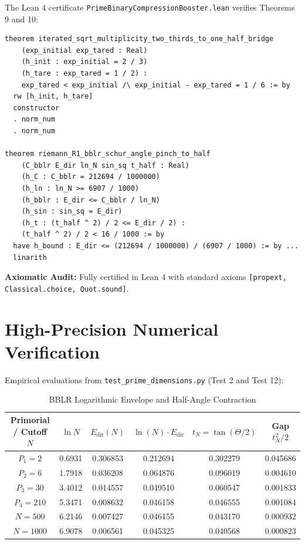 \documentclass[11pt,a4paper]{article}
\theoremstyle{definition}
\begin{document}
The Lean 4 certificate \texttt{PrimeBinaryCompressionBooster.lean} verifies Theorems 9 and 10:

\begin{lstlisting}[language=Lean4]
theorem iterated_sqrt_multiplicity_two_thirds_to_one_half_bridge
    (exp_initial exp_tared : Real)
    (h_init : exp_initial = 2 / 3)
    (h_tare : exp_tared = 1 / 2) :
    exp_tared < exp_initial /\ exp_initial - exp_tared = 1 / 6 := by
  rw [h_init, h_tare]
  constructor
  . norm_num
  . norm_num

theorem riemann_R1_bblr_schur_angle_pinch_to_half
    (C_bblr E_dir ln_N sin_sq t_half : Real)
    (h_C : C_bblr = 212694 / 1000000)
    (h_ln : ln_N >= 6907 / 1000)
    (h_bblr : E_dir <= C_bblr / ln_N)
    (h_sin : sin_sq = E_dir)
    (h_t : (t_half ^ 2) / 2 <= E_dir / 2) :
    (t_half ^ 2) / 2 < 16 / 1000 := by
  have h_bound : E_dir <= (212694 / 1000000) / (6907 / 1000) := by ...
  linarith
\end{lstlisting}

\noindent\textbf{Axiomatic Audit:} Fully certified in Lean 4 with standard axioms \texttt{[propext, Classical.choice, Quot.sound]}.


\section{High-Precision Numerical Verification}

Empirical evaluations from \texttt{test\_prime\_dimensions.py} (Test 2 and Test 12):

\begin{table}[htbp]
\centering
\caption{BBLR Logarithmic Envelope and Half-Angle Contraction}
\begin{tabular}{cccccc}
\toprule
Primorial / Cutoff $N$ & $\ln N$ & $E_{\mathrm{dir}}(N)$ & $\ln(N) \cdot E_{\mathrm{dir}}$ & $t_N = \tan(\Theta/2)$ & Gap $t_N^2 / 2$ \\
\midrule
$P_1 = 2$ & 0.6931 & 0.306853 & 0.212694 & 0.302279 & 0.045686 \\
$P_2 = 6$ & 1.7918 & 0.036208 & 0.064876 & 0.096019 & 0.004610 \\
$P_3 = 30$ & 3.4012 & 0.014557 & 0.049510 & 0.060547 & 0.001833 \\
$P_4 = 210$ & 5.3471 & 0.008632 & 0.046158 & 0.046555 & 0.001084 \\
$N = 500$ & 6.2146 & 0.007427 & 0.046155 & 0.043170 & 0.000932 \\
$N = 1000$ & 6.9078 & 0.006561 & 0.045325 & 0.040568 & 0.000823 \\
\bottomrule
\end{tabular}
\end{table}
\end{document}
